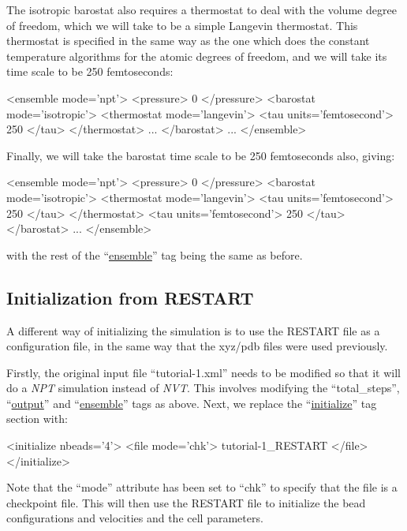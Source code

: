 \documentclass[11pt,english,fleqn]{report}
\newenvironment{code}{%
\footnotesize 
\verbatim
}{
\endverbatim
\normalsize
}
\begin{document}
The isotropic barostat also requires a thermostat
to deal with the volume degree of freedom, which we will take
to be a simple Langevin thermostat.
This thermostat is specified in the same way as the one which does the
constant temperature algorithms for the atomic degrees of freedom, and
we will take its time scale to be 250 femtoseconds:

\begin{code}
<ensemble mode='npt'>
   <pressure> 0 </pressure>
   <barostat mode='isotropic'>
      <thermostat mode='langevin'>
         <tau units='femtosecond'> 250 </tau>
      </thermostat>
      ...
   </barostat>
   ...
</ensemble>
\end{code}

Finally, we will take the barostat time scale to be 250 femtoseconds also, giving:

\begin{code}
<ensemble mode='npt'>
   <pressure> 0 </pressure>
   <barostat mode='isotropic'>
      <thermostat mode='langevin'>
         <tau units='femtosecond'> 250 </tau>
      </thermostat>
      <tau units='femtosecond'> 250 </tau>
   </barostat>
   ...
</ensemble>
\end{code}
with the rest of the {}``\hyperref[ENSEMBLE]{ensemble}'' 
tag being the same as before.

\subsection{Initialization from RESTART}

A different way of initializing the simulation is to use the 
RESTART file as a configuration file, in the same way that
the xyz/pdb files were used previously.

Firstly, the original input file {}``tutorial-1.xml'' needs to
be modified so that
it will do a \emph{NPT} simulation instead of \emph{NVT}. This involves modifying
the {}``total\_steps'', {}``\hyperref[OUTPUTS]{output}'' and 
{}``\hyperref[ENSEMBLE]{ensemble}'' tags as above. Next, we replace the 
{}``\hyperref[INITIALIZER]{initialize}'' tag section with:

\begin{code}
<initialize nbeads='4'>
   <file mode='chk'> tutorial-1_RESTART </file>
</initialize>
\end{code}

Note that the {}``mode'' attribute has been set to {}``chk''
to specify that the file is a checkpoint file.
This will then use the RESTART file to initialize the bead
configurations and velocities and the cell parameters.
\end{document}
